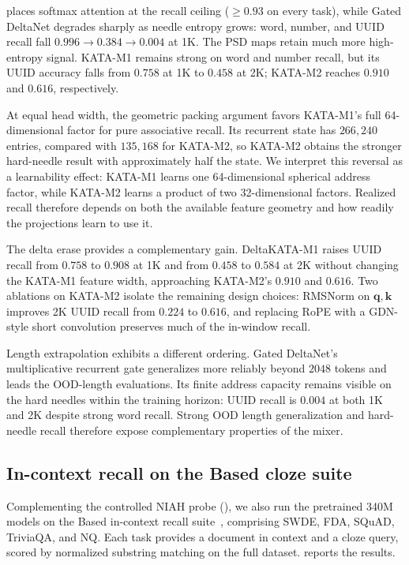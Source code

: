 \documentclass{article}
\newcommand{\1}{\bm{1}}
\def\vk{{\bm{k}}}
\def\vq{{\bm{q}}}
\theoremstyle{definition}
\begin{document}
 places softmax attention at the recall ceiling ($\ge 0.93$ on every task), while
Gated DeltaNet degrades sharply as needle entropy grows: word, number, and UUID recall fall
$0.996\!\to\!0.384\!\to\!0.004$ at 1K. The PSD maps retain much more high-entropy signal. KATA-M1
remains strong on word and number recall, but its UUID accuracy falls from $0.758$ at 1K to $0.458$
at 2K; KATA-M2 reaches $0.910$ and $0.616$, respectively.

At equal head width, the geometric packing argument favors KATA-M1's full 64-dimensional factor for
pure associative recall. Its recurrent state has $266{,}240$ entries, compared with $135{,}168$ for
KATA-M2, so KATA-M2 obtains the stronger hard-needle result with approximately half the state. We
interpret this reversal as a learnability effect: KATA-M1 learns one 64-dimensional spherical
address factor, while KATA-M2 learns a product of two 32-dimensional factors. Realized recall
therefore depends on both the available feature geometry and how readily the projections learn to
use it.

The delta erase provides a complementary gain. DeltaKATA-M1 raises UUID recall from $0.758$ to
$0.908$ at 1K and from $0.458$ to $0.584$ at 2K without changing the KATA-M1 feature width, approaching
KATA-M2's $0.910$ and $0.616$. Two ablations on KATA-M2 isolate the remaining design choices:
RMSNorm on $\vq,\vk$ improves 2K UUID recall from $0.224$ to $0.616$, and replacing RoPE with a
GDN-style short convolution preserves much of the in-window recall.

Length extrapolation exhibits a different ordering. Gated DeltaNet's multiplicative recurrent gate
generalizes more reliably beyond $2048$ tokens and leads the OOD-length evaluations. Its finite
address capacity remains visible on the hard needles within the training horizon: UUID recall is
$0.004$ at both 1K and 2K despite strong word recall. Strong OOD length generalization and
hard-needle recall therefore expose complementary properties of the mixer.


\subsection{In-context recall on the Based cloze suite}
\label{app:qa}
Complementing the controlled NIAH probe (), we also run the pretrained 340M models on
the Based in-context recall suite~\citep{arora24based}, comprising SWDE, FDA, SQuAD,
TriviaQA, and NQ. Each task provides a document in context and a cloze query, scored by normalized
substring matching on the full dataset.  reports the results.
\end{document}
